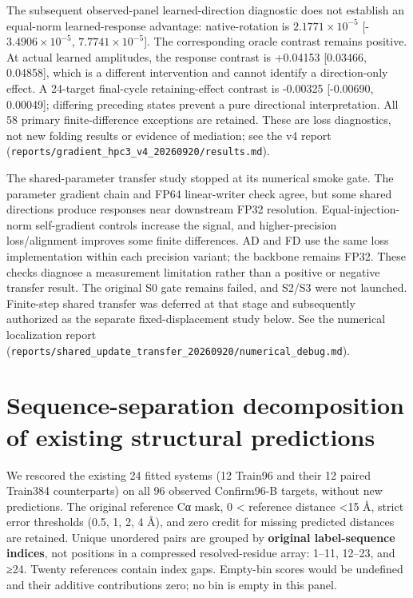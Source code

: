 The subsequent observed-panel learned-direction diagnostic does not establish
an equal-norm learned-response advantage: native-rotation is
\(2.1771\times10^{-5}\) {[}-\(3.4906\times10^{-5}\), \(7.7741\times10^{-5}\){]}.
The corresponding oracle contrast remains positive. At actual learned amplitudes,
the response contrast is +0.04153 {[}0.03466, 0.04858{]}, which is a different
intervention and cannot identify a direction-only effect. A 24-target final-cycle
retaining-effect contrast is -0.00325 {[}-0.00690, 0.00049{]}; differing preceding
states prevent a pure directional interpretation. All 58 primary finite-difference
exceptions are retained. These are loss diagnostics, not new folding results
or evidence of mediation; see the v4 report (\nolinkurl{reports/gradient_hpc3_v4_20260920/results.md}).

The shared-parameter transfer study stopped at its numerical smoke gate. The
parameter gradient chain and FP64 linear-writer check agree, but some shared
directions produce responses near downstream FP32 resolution. Equal-injection-norm
self-gradient controls increase the signal, and higher-precision loss/alignment
improves some finite differences. AD and FD use the same loss implementation
within each precision variant; the backbone remains FP32. These checks diagnose
a measurement limitation rather than a positive or negative transfer result.
The original S0 gate remains failed, and S2/S3 were not launched. Finite-step
shared transfer was deferred at that stage and subsequently authorized as the
separate fixed-displacement study below. See the
numerical localization report (\nolinkurl{reports/shared_update_transfer_20260920/numerical_debug.md}).

\section{Sequence-separation decomposition of existing structural predictions}\label{sequence-separation-decomposition-of-existing-structural-predictions}

We rescored the existing 24 fitted systems (12 Train96 and their 12 paired
Train384 counterparts) on all 96 observed Confirm96-B targets, without new
predictions. The original reference Cα mask, 0 \textless{} reference distance \textless15 Å,
strict error thresholds (0.5, 1, 2, 4 Å), and zero credit for missing predicted
distances are retained. Unique unordered pairs are grouped by \textbf{original
label-sequence indices}, not positions in a compressed resolved-residue array:
1--11, 12--23, and ≥24. Twenty references contain index gaps. Empty-bin scores
would be undefined and their additive contributions zero; no bin is empty in
this panel.

